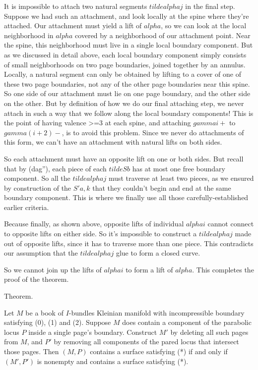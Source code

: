 \documentclass[12pt]{amsart}
\theoremstyle{definition}
\theoremstyle{remark}
\begin{document}
It is impossible to attach two natural segments $tildealphaj$ in the final
step.  Suppose we had such an attachment, and look locally at the spine where
they're attached. Our attachment must yield a lift of $alpha$, so we can look
at the local neighborhood in $alpha$ covered by a neighborhood of our
attachment point.  Near the spine, this neighborhood must live in a single
local boundary component. But as we discussed in detail above, each local
boundary component simply consists of small neighborhoods on two page
boundaries, joined together by an annulus. Locally, a natural segment can only
be obtained by lifting to a cover of one of these two page boundaries, not any
of the other page boundaries near this spine. So one side of our attachment
must lie on one page boundary, and the other side on the other. But by
definition of how we do our final attaching step, we never attach in such a way
that we follow along the local boundary components! This is the point of having
valence >=3 at each spine, and attaching $gammai+$ to $gamma(i+2)-$, is to
avoid this problem. Since we never do attachments of this form, we can't have
an attachment with natural lifts on both sides.

So each attachment must have an opposite lift on one or both sides. But recall
that by (dag''), each piece of each $tildeSb$ has at most one free boundary
component. So all the $tildealphaj$ must traverse at least two pieces, as we
ensured by construction of the $S'a,k$ that they couldn't begin and end at the
same boundary component. This is where we finally use all those
carefully-established earlier criteria.

Because finally, as shown above, opposite lifts of individual $alphai$ cannot
connect to opposite lifts on either side. So it's impossible to construct
a $tildealphaj$ made out of opposite lifts, since it has to traverse more than
one piece.  This contradicts our assumption that the $tildealphaj$ glue to form
a closed curve.

So we cannot join up the lifts of $alphai$ to form a lift of $alpha$. This
completes the proof of the theorem.


Theorem.


Let $M$ be a book of $I$-bundles Kleinian manifold with incompressible boundary
satisfying (0), (1) and (2). Suppose $M$ does contain a component of the
parabolic locus $P$ inside a single page's boundary. Construct $M'$ by deleting
all such pages from $M$, and $P'$ by removing all components of the pared locus
that intersect those pages. Then $(M,P)$ contains a surface satisfying (*) if
and only if $(M',P')$ is nonempty and contains a surface satisfying (*).
\end{document}
